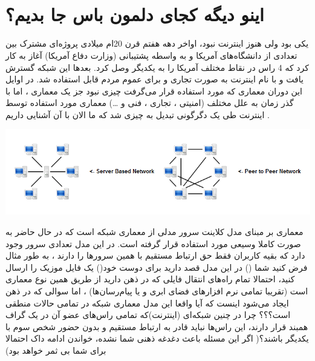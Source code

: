 \documentclass[]{article}
\begin{document}
\newpage
\pagestyle{fancy}
\fancyhf{}
\fancyfoot{}
\cfoot{\thepage}
\renewcommand{\headrulewidth}{2pt}

\KashidaOff



\tableofcontents

\newpage

 \Large \textbf{\\\\
}

\section*{{\titr اینو دیگه کجای دلمون باس جا بدیم؟}}


یکی بود ولی هنوز اینترنت نبود، اواخر دهه هفتم قرن 20ام میلادی پروژه‌ای مشترک بین تعدادی از دانشگاه‌های آمریکا و به واسطه پشتیبانی  (وزارت دفاع آمریکا) آغاز به کار کرد که 4 راس در نقاط مختلف آمریکا را به یکدیگر وصل کرد. بعدها این شبکه گسترش یافت و با نام اینترنت به صورت تجاری و برای عموم مردم قابل استفاده شد. در اوایل این دوران معماری که مورد استفاده قرار می‌گرفت چیزی نبود جز یک معماری  ، اما با گذر زمان به علل مختلف (امنیتی ، تجاری ، فنی و …) معماری مورد استفاده توسط اینترنت طی یک دگرگونی تبدیل به چیزی شد که ما الان با آن آشنایی داریم .

\includegraphics[width=1\textwidth]{images/pasted image 0.png}

معماری بر مبنای مدل کلاینت سرور مدلی از معماری شبکه است که در حال حاضر به صورت کاملا وسیعی مورد استفاده قرار گرفته است. در این مدل تعدادی سرور وجود دارد که بقیه کاربران فقط حق ارتباط مستقیم با همین سرورها را دارند ، به طور مثال فرض کنید شما () در این مدل قصد دارید برای دوست خود() یک فایل موزیک را ارسال کنید، احتمالا تمام راه‌های انتقال فایلی که در ذهن دارید از طریق همین نوع معماری است (تقریبا تمامی نرم افزارهای فضای ابری و یا پیام‌رسان‌ها) ، اما سوالی که در ذهن ایجاد می‌شود اینست که آیا واقعا این مدل معماری شبکه در تمامی حالات منطقی است؟؟؟ چرا در چنین شبکه‌ای (اینترنت)که تمامی راس‌های عضو آن در یک گراف همبند قرار دارند، این راس‌ها نباید قادر به ارتباط مستقیم و بدون حضور شخص سوم با یکدیگر باشند؟( اگر این مسئله باعث دغدغه ذهنی شما نشده، خواندن ادامه داک احتمالا برای شما بی ثمر خواهد بود)
\end{document}
